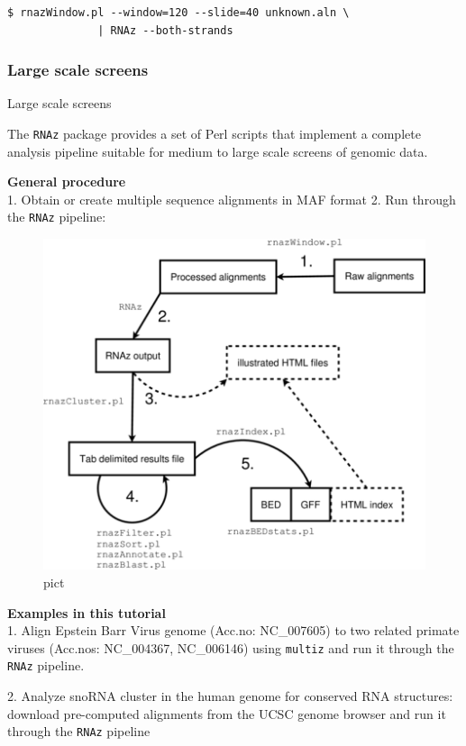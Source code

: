 \documentclass[]{article}
\begin{document}
\begin{verbatim}
$ rnazWindow.pl --window=120 --slide=40 unknown.aln \
              | RNAz --both-strands
\end{verbatim}

\subsubsection{Large scale screens}{Large scale screens}\label{large-scale-screens}

The \texttt{RNAz} package provides a set of Perl scripts that implement
a complete analysis pipeline suitable for medium to large scale screens
of genomic data.

\textbf{General procedure}\\
1. Obtain or create multiple sequence alignments in MAF format 2. Run
through the \texttt{RNAz} pipeline:

\begin{figure}[htbp]
\centering
\includegraphics{Figs/flowchart.png}
\caption{pict}
\end{figure}

\textbf{Examples in this tutorial}\\
1. Align Epstein Barr Virus genome (Acc.no: NC\_007605) to two related
primate viruses (Acc.nos: NC\_004367, NC\_006146) using \texttt{multiz}
and run it through the \texttt{RNAz} pipeline.
 2. Analyze snoRNA cluster in the human genome
for conserved RNA structures: download pre-computed alignments from the
UCSC genome browser and run it through the \texttt{RNAz} pipeline
\end{document}
